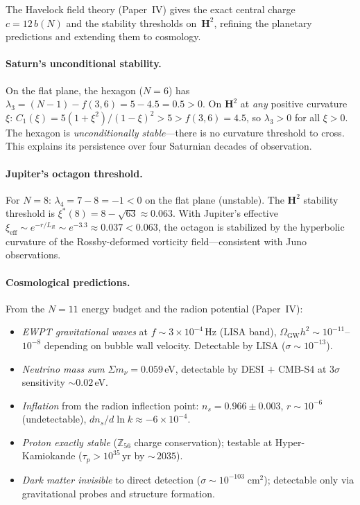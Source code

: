 The Havelock field theory (Paper~IV) gives the exact central
charge $c = 12\,b(N)$ and the stability thresholds on~$\mathbf{H}^2$,
refining the planetary predictions and extending them to cosmology.

\paragraph{Saturn's unconditional stability.}
On the flat plane, the hexagon ($N = 6$) has
$\lambda_3 = (N{-}1) - f(3,6) = 5 - 4.5 = 0.5 > 0$.
On $\mathbf{H}^2$ at \emph{any} positive curvature~$\xi$:
$C_1(\xi) = 5(1{+}\xi^2)/(1{-}\xi)^2 > 5 > f(3,6) = 4.5$,
so $\lambda_3 > 0$ for all $\xi > 0$.
The hexagon is \emph{unconditionally stable}---there is no
curvature threshold to cross.
This explains its persistence over four Saturnian decades of observation.

\paragraph{Jupiter's octagon threshold.}
For $N = 8$: $\lambda_4 = 7 - 8 = -1 < 0$ on the flat plane (unstable).
The $\mathbf{H}^2$ stability threshold is
$\xi^*(8) = 8 - \sqrt{63} \approx 0.063$.
With Jupiter's effective $\xi_{\mathrm{eff}} \sim e^{-r/L_R}
\sim e^{-3.3} \approx 0.037 < 0.063$,
the octagon is stabilized by the hyperbolic curvature of the
Rossby-deformed vorticity field---consistent with Juno observations.

\paragraph{Cosmological predictions.}
From the $N = 11$ energy budget and the radion potential (Paper~IV):
\begin{itemize}
\item \emph{EWPT gravitational waves} at $f \sim 3 \times 10^{-4}$\,Hz
  (LISA band), $\Omega_{\mathrm{GW}} h^2 \sim 10^{-11}$--$10^{-8}$
  depending on bubble wall velocity.
  Detectable by LISA ($\sigma \sim 10^{-13}$).
\item \emph{Neutrino mass sum} $\Sigma m_\nu = 0.059$\,eV,
  detectable by DESI $+$ CMB-S4 at $3\sigma$ sensitivity $\sim 0.02$\,eV.
\item \emph{Inflation} from the radion inflection point:
  $n_s = 0.966 \pm 0.003$, $r \sim 10^{-6}$ (undetectable),
  $dn_s/d\ln k \approx -6 \times 10^{-4}$.
\item \emph{Proton exactly stable} ($\mathbb{Z}_{56}$ charge conservation);
  testable at Hyper-Kamiokande ($\tau_p > 10^{35}$\,yr by ${\sim}\,2035$).
\item \emph{Dark matter invisible} to direct detection
  ($\sigma \sim 10^{-103}\;\mathrm{cm}^2$);
  detectable only via gravitational probes and structure formation.
\end{itemize}

